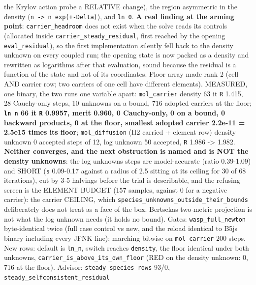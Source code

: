 \documentclass[english,a4paper]{my_memo}
\begin{document}
\begin{itemize}
  the Krylov action probe a RELATIVE change), the region asymmetric in the
  density (\texttt{n\ -\textgreater{}\ n\ exp(+-Delta)}), and \texttt{ln\ 0}. \textbf{A real finding at the
  arming point}: \texttt{carrier\_headroom} does not exist when the solve reads
  its controls (allocated inside \texttt{carrier\_steady\_residual}, first reached
  by the opening \texttt{eval\_residual}), so the first implementation silently
  fell back to the density unknown on every coupled run; the opening state is
  now packed as a density and rewritten as logarithms after that
  evaluation, sound because the residual is a function of the state and
  not of its coordinates. Floor array made rank 2 (cell AND carrier row;
  two carriers of one cell have different elements). MEASURED, one binary,
  the two runs one variable apart: \texttt{mol\_carrier} density 63 it \texttt{\textbar{}\textbar{}R\textbar{}\textbar{}}
  1.415, 28 Cauchy-only steps, 10 unknowns on a bound, 716 adopted
  carriers at the floor; \textbf{\texttt{ln\ n} 66 it \texttt{\textbar{}\textbar{}R\textbar{}\textbar{}} 0.9957, merit 0.960, 0
  Cauchy-only, 0 on a bound, 0 backward products, 0 at the floor, smallest
  adopted carrier 2.2e-11 = 2.5e15 times its floor}; \texttt{mol\_diffusion} (H2
  carried + element row) density unknown 0 accepted steps of 12, log unknown 50
  accepted, \texttt{\textbar{}\textbar{}R\textbar{}\textbar{}} 1.986 -\textgreater{} 1.982. \textbf{Neither converges, and the next
  obstruction is named and is NOT the density unknown\textquotesingle s}: the log unknown\textquotesingle s steps
  are model-accurate (ratio 0.39-1.09) and SHORT (\texttt{\textbar{}\textbar{}s\textbar{}\textbar{}} 0.09-0.17 against
  a radius of 2.5 sitting at its ceiling for 30 of 68 iterations), cut by
  3-5 halvings before the trial is describable, and the refusing screen is
  the ELEMENT BUDGET (157 samples, against 0 for a negative carrier): the
  carrier CEILING, which \texttt{species\_unknowns\_outside\_their\_bounds}
  deliberately does not treat as a face of the box. Bertsekas\textquotesingle{} two-metric
  projection is not what the log unknown needs (it holds no bound). Gates:
  \texttt{wasp\_full\_newton} byte-identical twice (full case control vs new, and
  the reload identical to B5j\textquotesingle s binary including every JFNK line); marching
  bitwise on \texttt{mol\_carrier} 200 steps. New rows: default is \texttt{ln\_n}, switch
  reaches \texttt{density}, the floor identical under both unknowns,
  \texttt{carrier\_is\_above\_its\_own\_floor} (RED on the density unknown: 0, 716 at the
  floor). Advisor: \texttt{steady\_species\_rows} 93/0, \texttt{steady\_selfconsistent\_residual}

\end{itemize}
\end{document}
